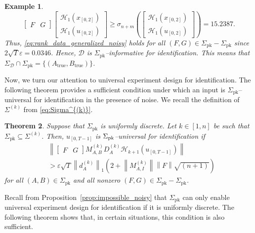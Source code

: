 \documentclass[journal,twoside,web]{ieeecolor}
\newcommand{\norm}[1]{\left\|#1\right\|}
\newtheorem{theorem}{Theorem}
\newtheorem{example}[theorem]{Example}
\begin{document}
\begin{example}
\begin{equation}
{\begin{bmatrix}
F \! & \! G
\end{bmatrix}\!\!\begin{bmatrix}
\mathcal{H}_1(x_{[0,2]}) \\
\mathcal{H}_1(u_{[0,2]})
\end{bmatrix}}\!\geq\! \sigma_{n+m}\left(\!\begin{bmatrix}
\mathcal{H}_1(x_{[0,2]}) \\
\mathcal{H}_1(u_{[0,2]})
\end{bmatrix}\!\right)\!=\!15.2387.
\end{equation}
Thus, \eqref{eq:rank_data_generalized_noisy} holds for all $(F,G)\in\Sigma_\text{pk}-\Sigma_\text{pk}$ since \mbox{$2\sqrt{T}\varepsilon=0.0346$}. Hence, $\mathcal{D}$ is \mbox{$\Sigma_\text{pk}$--informative} for identification. This means that $\Sigma_\mathcal{D}\cap\Sigma_\text{pk}=\{(A_\text{true},B_\text{true})\}$.
\end{example}

Now, we turn our attention to universal experiment design for identification. The following theorem provides a sufficient condition under which an input is $\Sigma_\text{pk}$--universal for identification in the presence of noise. We recall the definition of $\Sigma^{(k)}$ from \eqref{eq:Sigma^{(k)}}. 

\begin{theorem}
\label{th:GM_noisy_generalized}
Suppose that $\Sigma_\text{pk}$ is uniformly discrete. Let $k\in[1,n]$ be such that $\Sigma_\text{pk}\subseteq\Sigma^{(k)}$. Then, $u_{[0,T-1]}$ is \mbox{$\Sigma_\textup{pk}$--universal} for identification if 
\begin{equation}
\label{eq:th:GM_noisy_generalized-1}
\begin{split}
&\norm{\begin{bmatrix}
F & G
\end{bmatrix}M_{A,B}^{(k)}D_A^{(k)}\mathcal{H}_{k+1}(u_{[0,T-1]})
}\\
&>\varepsilon\sqrt{T}\norm{d_A^{(k)}}_1\left(2+\norm{M_{A,I}^{(k)}}\norm{F}\sqrt{(n+1)}\right)
\end{split}
\end{equation}
for all $(A,B)\in\Sigma_\text{pk}$ and all nonzero $(F,G)\in\Sigma_\text{pk}-\Sigma_\text{pk}$.
\end{theorem}

Recall from Proposition~\ref{prop:impossible_noisy} that $\Sigma_\text{pk}$ can only enable universal experiment design for identification if it is uniformly discrete. The following theorem shows that, in certain situations, this condition is also sufficient. 
\end{document}
